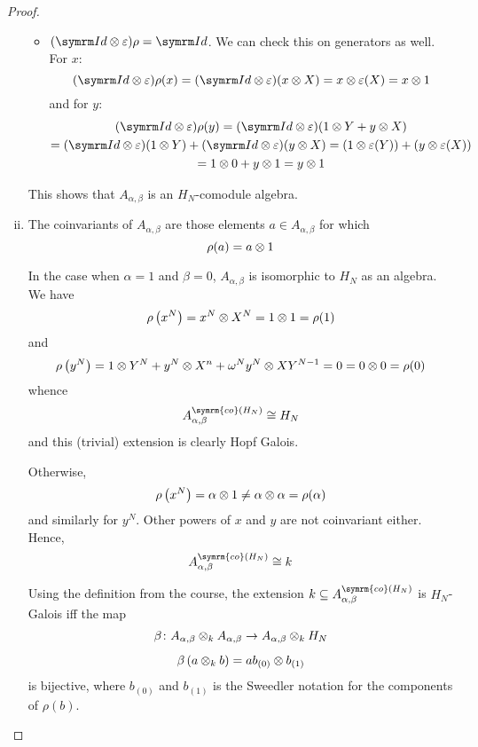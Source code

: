 \begin{proof}
\begin{enumerate}[(i)]
\begin{itemize}
        \item \((\Id \tensor \varepsilon) \rho = \Id\). We can check this on generators as well. For \(x\):
        \[
            (\Id \tensor \varepsilon) \rho(x) = (\Id \tensor \varepsilon) (x \tensor X) = x \tensor \varepsilon(X) = x \tensor 1
        \]
        and for \(y\):
        \begin{gather*}
            (\Id \tensor \varepsilon) \rho(y) = (\Id \tensor \varepsilon) (1 \tensor Y + y \tensor X) \\
            = (\Id \tensor \varepsilon) (1 \tensor Y) + (\Id \tensor \varepsilon) (y \tensor X) = (1 \tensor \varepsilon(Y)) + (y \tensor \varepsilon(X)) \\
            = 1 \tensor 0 + y \tensor 1 = y \tensor 1
        \end{gather*}
    \end{itemize}
    This shows that \(A_{\alpha, \beta}\) is an \(H_N\)-comodule algebra.

    \item The coinvariants of \(A_{\alpha, \beta}\) are those elements \(a \in A_{\alpha, \beta}\) for which
    \[
        \rho(a) = a \otimes 1
    \]

    In the case when \(\alpha = 1\) and \(\beta = 0\), \(A_{\alpha, \beta}\) is isomorphic to \(H_N\) as an algebra. We have
    \[
        \rho\left(x^N\right) = x^N \otimes X^N = 1 \otimes 1 = \rho(1)
    \]
    and
    \[
        \rho\left(y^N\right) = 1 \otimes Y^N + y^N \otimes X^n + \omega^N y^N \otimes XY^{N - 1} = 0 = 0 \otimes 0 = \rho(0)
    \]
    whence
    \[
        A_{\alpha, \beta}^{\symrm{co} \left(H_N\right)} \cong H_N
    \]
    and this (trivial) extension is clearly Hopf Galois.

    Otherwise,
    \[
        \rho\left(x^N\right) = \alpha \otimes 1 \neq \alpha \otimes \alpha = \rho(\alpha)
    \]
    and similarly for \(y^N\). Other powers of \(x\) and \(y\) are not coinvariant either. Hence,
    \[
        A_{\alpha, \beta}^{\symrm{co} \left(H_N\right)} \cong k
    \]

    Using the definition from the course, the extension \(k \subseteq A_{\alpha, \beta}^{\symrm{co} \left(H_N\right)}\) is \(H_N\)-Galois iff the map
    \begin{gather*}
        \beta \colon A_{\alpha, \beta} \otimes_{k} A_{\alpha, \beta} \to A_{\alpha, \beta} \otimes_{k} H_N \\[0.5em]
        \beta\left(a \otimes_{k} b\right) = a b_{(0)} \otimes b_{(1)}
    \end{gather*}
    is bijective, where \(b_{(0)}\) and \(b_{(1)}\) is the Sweedler notation for the components of \(\rho(b)\).


\end{enumerate}
\end{proof}
